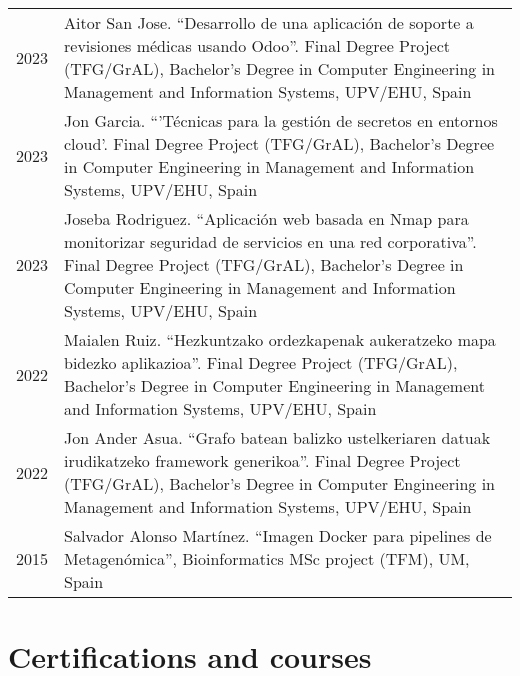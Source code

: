 \documentclass[11pt,fullpage]{article}
\begin{document}
\begin{longtable}{p{0.5in}|p{5.5in}}
2023 & Aitor San Jose. ``Desarrollo de una aplicación de soporte a revisiones médicas usando Odoo''. Final Degree Project (TFG/GrAL), Bachelor's Degree in Computer Engineering in Management and Information Systems, UPV/EHU, Spain \\
2023 & Jon Garcia. ``'Técnicas para la gestión de secretos en entornos cloud'. Final Degree Project (TFG/GrAL), Bachelor's Degree in Computer Engineering in Management and Information Systems, UPV/EHU, Spain \\
2023 & Joseba Rodriguez. ``Aplicación web basada en Nmap para monitorizar seguridad de servicios en una red corporativa''. Final Degree Project (TFG/GrAL), Bachelor's Degree in Computer Engineering in Management and Information Systems, UPV/EHU, Spain \\
2022 & Maialen Ruiz. ``Hezkuntzako ordezkapenak aukeratzeko mapa bidezko aplikazioa''. Final Degree Project (TFG/GrAL), Bachelor's Degree in Computer Engineering in Management and Information Systems, UPV/EHU, Spain \\
2022 & Jon Ander Asua. ``Grafo batean balizko ustelkeriaren datuak irudikatzeko framework generikoa''. Final Degree Project (TFG/GrAL), Bachelor's Degree in Computer Engineering in Management and Information Systems, UPV/EHU, Spain \\
2015 & Salvador Alonso Mart\'inez. ``Imagen Docker para pipelines de Metagen\'omica'', Bioinformatics MSc project (TFM), UM, Spain \\

\end{longtable}

\section*{Certifications and courses}
\end{document}
